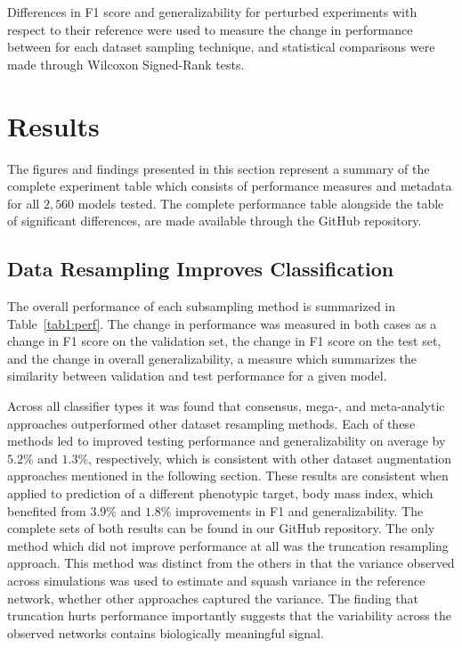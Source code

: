 \documentclass[10pt]{SelfArx} %
\newcommand{\new}[1]{\color{blue}#1\color{black}}
\begin{document}
Differences in F1 score and generalizability for perturbed experiments with respect to their reference were used to
measure the change in performance between for each dataset sampling technique, and statistical comparisons were made
through Wilcoxon Signed-Rank tests.


\section*{Results}

The figures and findings presented in this section represent a summary of the complete experiment table which consists
of performance measures and metadata for all $2,560$ models tested. The complete performance table alongside the table
of significant differences, are made available through the GitHub repository.

\subsection*{Data Resampling Improves Classification}

The overall performance of each subsampling method is summarized in Table~\ref{tab1:perf}. The change in performance
was measured in both cases as a change in F1 score on the validation set, the change in F1 score on the test set, and
the change in overall generalizability, a measure which summarizes the similarity between validation and test
performance for a given model.

Across all classifier types it was found that consensus, mega-, and meta-analytic approaches outperformed other dataset
resampling methods. Each of these methods led to improved testing performance and generalizability \new{on average
by $5.2\%$ and $1.3\%$, respectively, which is consistent with other dataset augmentation approaches mentioned in the
following section. These results are consistent when applied to prediction of a different phenotypic target, body mass
index, which benefited from $3.9\%$ and $1.8\%$ improvements in F1 and generalizability. The complete sets of both
results can be found in our GitHub repository}. The only method which did not improve performance at all was the
truncation resampling approach. This method was distinct from the others in that the variance observed across
simulations was used to estimate and squash variance in the reference network, whether other approaches captured the
variance. The finding that truncation hurts performance importantly suggests that the variability across the observed
networks contains biologically meaningful signal.
\end{document}
